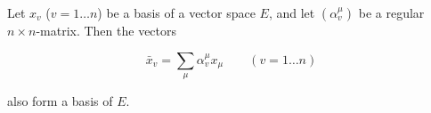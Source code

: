 Let $x_v$ ($v = 1 \ldots n$) be a basis of a vector space $E$, and let $(\alpha_v^\mu)$ be a regular $n \times n$-matrix. Then the vectors

$$\bar{x}_v = \sum_{\mu} \alpha_v^\mu x_\mu \qquad (v = 1 \ldots n)$$

also form a basis of $E$.
